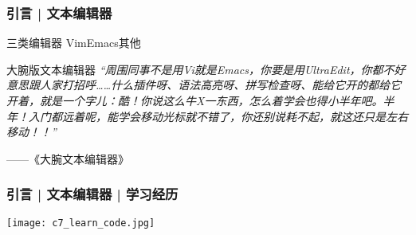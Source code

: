\begin{frame}
  \frametitle{引言 | 文本编辑器}
  \begin{block}{三类编辑器}
    Vim\qquad Emacs\qquad 其他
  \end{block}
  \pause
  \begin{block}{大腕版文本编辑器}
  \textit{“周围同事不是用Vi就是Emacs，你要是用UltraEdit，你都不好意思跟人家打招呼……什么插件呀、语法高亮呀、拼写检查呀、能给它开的都给它开着，就是一个字儿：酷！你说这么牛X一东西，怎么着学会也得小半年吧。半年！入门都远着呢，能学会移动光标就不错了，你还别说耗不起，就这还只是左右移动！！” }
  \begin{flushright}
    ——《大腕\textbullet 文本编辑器》
  \end{flushright}
\end{block}
\end{frame}

\begin{frame}
  \frametitle{引言 | 文本编辑器 | 学习经历}
  \begin{center}
    \texttt{[image: c7\_learn\_code.jpg]}
  \end{center}
\end{frame}


